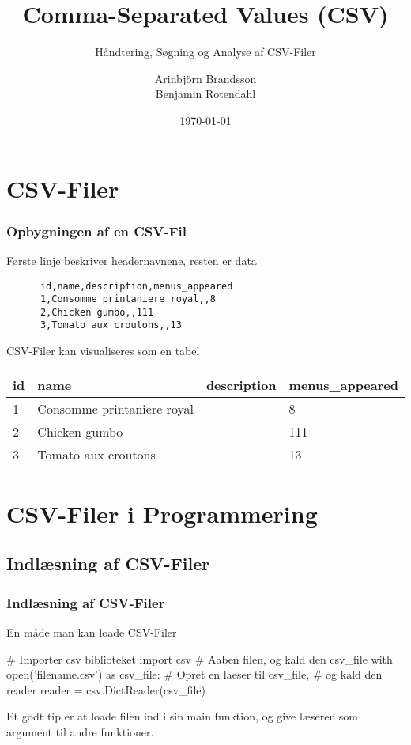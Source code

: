 \documentclass[aspectratio=169,12pt,t]{beamer}
\title{Comma-Separated Values (CSV)}
\subtitle{Håndtering, Søgning og Analyse af CSV-Filer}
\author{
        Arinbjörn Brandsson \\
        Benjamin Rotendahl  \\
}
\date[]{\today}
\begin{document}
\frame[plain]{\titlepage}
 \frame{\tableofcontents}

\section{CSV-Filer}

\begin{frame}[fragile]
  \frametitle{Opbygningen af en CSV-Fil}
  \vspace*{-12pt}
  \begin{block}{Første linje beskriver headernavnene, resten er data}
    \begin{lstlisting}
      id,name,description,menus_appeared                                                
      1,Consomme printaniere royal,,8
      2,Chicken gumbo,,111
      3,Tomato aux croutons,,13
    \end{lstlisting}
  \end{block}
  \begin{block}{CSV-Filer kan visualiseres som en tabel}
  \begin{table}
    \begin{tabular}{ | l | l | l | l | }
      \hline
      id&name&description&menus\_appeared\\                                                
      \hline
      1&Consomme printaniere royal&&8\\
      \hline
      2&Chicken gumbo&&111\\
      \hline
      3&Tomato aux croutons&&13\\\hline
    \end{tabular}
  \end{table}
  \end{block}
\end{frame}

\section{CSV-Filer i Programmering}
\subsection{Indlæsning af CSV-Filer}
\begin{frame}[fragile]
  \frametitle{Indlæsning af CSV-Filer}
  \vspace*{-14pt}
  \begin{block}{En måde man kan loade CSV-Filer}
    \begin{python}
# Importer csv biblioteket
import csv
# Aaben filen, og kald den csv_file
with open('filename.csv') as csv_file:
    # Opret en laeser til csv_file, 
    # og kald den reader
    reader = csv.DictReader(csv_file)
  \end{python}
  Et godt tip er at loade filen ind i sin main funktion, og give læseren 
  som argument til andre funktioner. 
  \end{block}
\end{frame}
\end{document}
